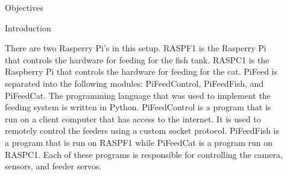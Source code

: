 \documentclass[final]{beamer}
\newlength{\sepwid}
\newlength{\onecolwid}
\newlength{\twocolwid}
\begin{document}
\begin{frame}[t]
\begin{columns}[t]
\begin{column}{\onecolwid}
\begin{alertblock}{Objectives}
\end{alertblock}


\begin{block}{Introduction}

There are two Rasperry Pi's in this setup. RASPF1 is the Rasperry Pi that
controls the hardware for feeding for the fish tank. RASPC1 is the Raspberry Pi that
controls the hardware for feeding for the cat. PiFeed is separated into the
following modules: PiFeedControl, PiFeedFish, and PiFeedCat. The programming
language that was used to implement the feeding system is written in Python.
PiFeedControl is a program that is run on a client computer that has access to
the internet. It is used to remotely control the feeders using a custom socket
protocol. PiFeedFish is a program that is run on RASPF1 while PiFeedCat is a
program run on RASPC1. Each of these programs is responsible for controlling the
camera, sensors, and feeder servos.

\end{block}




\end{column} %

\begin{column}{\sepwid}\end{column} %

\begin{column}{\twocolwid} %

\begin{columns}[t,totalwidth=\twocolwid] %

\begin{column}{\onecolwid}\vspace{-.6in} %





\end{column}
\end{columns}
\end{column}
\end{columns}
\end{frame}
\end{document}
